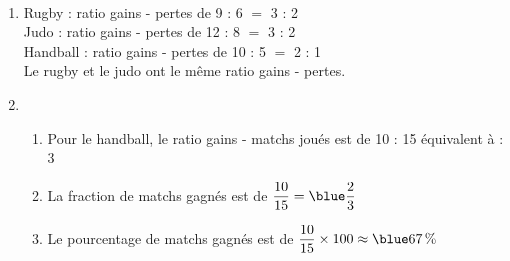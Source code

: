   \ \\ [-5mm]
  \begin{enumerate}
      \item Rugby : ratio gains - pertes de 9 : 6 $=$ 3 : 2 \\
      Judo : ratio gains - pertes de 12 : 8 $=$ 3 : 2 \\
      Handball : ratio gains - pertes de 10 : 5 $=$ 2 : 1 \\
      {\blue Le rugby et le judo ont le même ratio gains - pertes.}
      \item
      \begin{enumerate}
         \item Pour le handball, le ratio gains - matchs joués est de 10 : 15 équivalent à { : 3} \\
         \item La fraction de matchs gagnés est de $\dfrac{10}{15} = \blue \dfrac23$ \\ [1mm]
         \item Le pourcentage de matchs gagnés est de $\dfrac{10}{15}\times100 \approx {\blue 67\,\%}$
      \end{enumerate}
   \end{enumerate}
